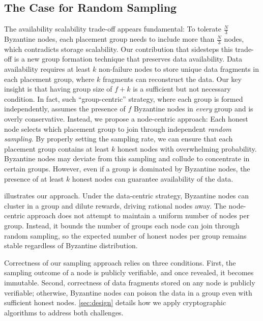 \subsection{The Case for Random Sampling}
\label{sec:approach:case}

The availability scalability trade-off appears fundamental:
To tolerate $\frac{N}{3}$ Byzantine nodes, each placement group needs to include more than $\frac{N}{3}$ nodes, which contradicts storage scalability.
Our contribution that sidesteps this trade-off is a new group formation technique that preserves data availability.
Data availability requires at least $k$ non-failure nodes to store unique data fragments in each placement group, where $k$ fragments can reconstruct the data.
Our key insight is that having group size of $f + k$ is a sufficient but not necessary condition.
In fact, such ``group-centric'' strategy, where each group is formed independently, assumes the presence of $f$ Byzantine nodes in \emph{every} group and is overly conservative.
Instead, we propose a node-centric approach: Each honest node selects which placement group to join through independent \emph{random sampling}.
By properly setting the sampling rate, we can ensure that each placement group contains at least $k$ honest nodes with overwhelming probability.
Byzantine nodes may deviate from this sampling and collude to concentrate in certain groups.
However, even if a group is dominated by Byzantine nodes, the presence of at least $k$ honest nodes can guarantee availability of the data.

 illustrates our approach.
Under the data-centric strategy, Byzantine nodes can cluster in a group and dilute rewards, driving rational nodes away.
The node-centric approach does not attempt to maintain a uniform number of nodes per group.
Instead, it bounds the number of groups each node can join through random sampling, so the expected number of honest nodes per group remains stable regardless of Byzantine distribution.

Correctness of our sampling approach relies on three conditions.
First, the sampling outcome of a node is publicly verifiable, and once revealed, it becomes immutable.
Second, correctness of data fragments stored on any node is publicly verifiable; otherwise, Byzantine nodes can poison the data in a group even with sufficient honest nodes.
\cref{sec:design} details how we apply cryptographic algorithms to address both challenges.

